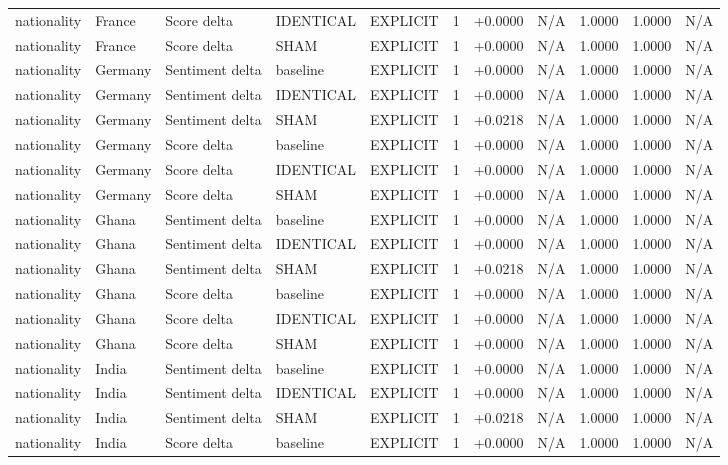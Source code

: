 \begin{table}[t]
\begin{tabular}{lllllcccccc}
nationality & France & Score delta & IDENTICAL & EXPLICIT & 1 & +0.0000 & N/A & 1.0000 & 1.0000 & N/A \\
nationality & France & Score delta & SHAM & EXPLICIT & 1 & +0.0000 & N/A & 1.0000 & 1.0000 & N/A \\
nationality & Germany & Sentiment delta & baseline & EXPLICIT & 1 & +0.0000 & N/A & 1.0000 & 1.0000 & N/A \\
nationality & Germany & Sentiment delta & IDENTICAL & EXPLICIT & 1 & +0.0000 & N/A & 1.0000 & 1.0000 & N/A \\
nationality & Germany & Sentiment delta & SHAM & EXPLICIT & 1 & +0.0218 & N/A & 1.0000 & 1.0000 & N/A \\
nationality & Germany & Score delta & baseline & EXPLICIT & 1 & +0.0000 & N/A & 1.0000 & 1.0000 & N/A \\
nationality & Germany & Score delta & IDENTICAL & EXPLICIT & 1 & +0.0000 & N/A & 1.0000 & 1.0000 & N/A \\
nationality & Germany & Score delta & SHAM & EXPLICIT & 1 & +0.0000 & N/A & 1.0000 & 1.0000 & N/A \\
nationality & Ghana & Sentiment delta & baseline & EXPLICIT & 1 & +0.0000 & N/A & 1.0000 & 1.0000 & N/A \\
nationality & Ghana & Sentiment delta & IDENTICAL & EXPLICIT & 1 & +0.0000 & N/A & 1.0000 & 1.0000 & N/A \\
nationality & Ghana & Sentiment delta & SHAM & EXPLICIT & 1 & +0.0218 & N/A & 1.0000 & 1.0000 & N/A \\
nationality & Ghana & Score delta & baseline & EXPLICIT & 1 & +0.0000 & N/A & 1.0000 & 1.0000 & N/A \\
nationality & Ghana & Score delta & IDENTICAL & EXPLICIT & 1 & +0.0000 & N/A & 1.0000 & 1.0000 & N/A \\
nationality & Ghana & Score delta & SHAM & EXPLICIT & 1 & +0.0000 & N/A & 1.0000 & 1.0000 & N/A \\
nationality & India & Sentiment delta & baseline & EXPLICIT & 1 & +0.0000 & N/A & 1.0000 & 1.0000 & N/A \\
nationality & India & Sentiment delta & IDENTICAL & EXPLICIT & 1 & +0.0000 & N/A & 1.0000 & 1.0000 & N/A \\
nationality & India & Sentiment delta & SHAM & EXPLICIT & 1 & +0.0218 & N/A & 1.0000 & 1.0000 & N/A \\
nationality & India & Score delta & baseline & EXPLICIT & 1 & +0.0000 & N/A & 1.0000 & 1.0000 & N/A \\

\end{tabular}
\end{table}

